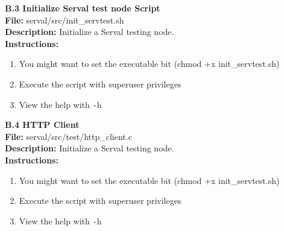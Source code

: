 \documentclass[12pt,a4paper,oneside]{article}
\begin{document}
\newpage
{}
{}
{\huge \bf \noindent B.3 Initialize Serval test node Script}\\[0.5cm]
\textbf{File:} serval/src/init\_servtest.sh\\
\textbf{Description:} Initialize a Serval testing node.\\
\textbf{Instructions: }
\begin{enumerate} \itemsep1pt \parskip0pt 
	\item You might want to set the executable bit (chmod +x init\_servtest.sh)
	\item Execute the script with superuser privileges
	\item View the help with \texttt{-}h\\[0.5cm]
\end{enumerate}


\newpage
{}
{}
{\huge \bf \noindent B.4 HTTP Client}\\[0.5cm]
\textbf{File:} serval/src/test/http\_client.c\\
\textbf{Description:} Initialize a Serval testing node.\\
\textbf{Instructions: }
\begin{enumerate} \itemsep1pt \parskip0pt 
	\item You might want to set the executable bit (chmod +x init\_servtest.sh)
	\item Execute the script with superuser privileges
	\item View the help with \texttt{-}h\\[0.5cm]
\end{enumerate}

\end{document}
